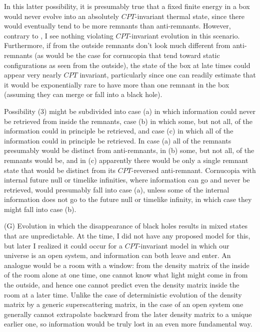 \documentclass[12pt]{article}
\begin{document}
     In this latter possibility, it is presumably true
\cite{HawHay,Haw93pri} that a fixed finite energy in a box would
never evolve into an absolutely $CPT$-invariant thermal state,
since there would eventually tend to be more remnants than
anti-remnants.  However, contrary to \cite{HawHay,Haw93pri},
I see nothing violating $CPT$-invariant evolution in this
scenario.  Furthermore, if from the outside remnants don't look
much different from anti-remnants (as would be the case for
cornucopia that tend toward static configurations as seen from
the outside), the state of the box at late
times could appear very nearly $CPT$ invariant, particularly
since one can readily estimate that it would be exponentially
rare to have more than one remnant in the box (assuming
they can merge or fall into a black hole).

     Possibility (3) might be subdivided into case (a) in which
information could never be retrieved from inside the remnants,
case (b) in which some, but not all, of the information could
in principle be retrieved, and case (c) in which all of the
information could in principle be retrieved.  In case (a) all
of the remnants presumably would be distinct from
anti-remnants, in (b) some, but not all, of the remnants would
be, and in (c) apparently there would be only a single remnant
state that would be distinct from its $CPT$-reversed
anti-remnant.  Cornucopia with internal future null or timelike
infinities, where information can go and never be retrieved,
would presumably fall into case (a), unless some of the internal
information does not go to the future null or timelike infinity,
in which case they might fall into case (b).

     (G) Evolution in which the disappearance of black holes results
in mixed
states that are unpredictable.  At the time, I did not have any
proposed model
for this, but later I realized \cite{Pag82,Pag83} it could occur for
a
$CPT$-invariant model in which our universe is an open system, and
information
can both leave and enter.  An analogue would be a room with a window:
from the
density matrix of the inside of the room alone at one time, one
cannot know
what light might come in from the outside, and hence one cannot
predict even
the density matrix inside the room at a later time.  Unlike the case
of
deterministic evolution of the density matrix by a generic
superscattering
matrix, in the case of an open system one generally cannot
extrapolate backward
from the later density matrix to a unique earlier one, so information
would be
truly lost in an even more fundamental way.
\end{document}
